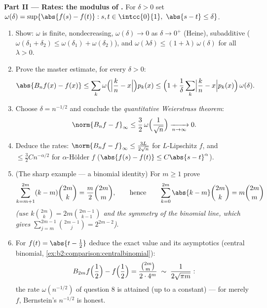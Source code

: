 \begin{problem}
\medskip
\noindent\textbf{Part II --- Rates: the modulus of .}
For $\delta > 0$ set $\omega(\delta) = \sup\{\abs{f(s) - f(t)}
: s, t \in \intcc{0}{1},\ \abs{s - t} \leq \delta\}$.
\begin{enumerate}[resume]
  \item Show: $\omega$ is finite, nondecreasing,
        $\omega(\delta) \to 0$ as $\delta \to 0^+$ (Heine),
        subadditive ($\omega(\delta_1 + \delta_2) \leq
        \omega(\delta_1) + \omega(\delta_2)$), and
        $\omega(\lambda\delta) \leq (1 +
        \lambda)\,\omega(\delta)$ for all $\lambda > 0$.
  \item Prove the master estimate, for every $\delta > 0$:
        \[
        \abs{B_nf(x) - f(x)}
        \leq \sum_k \omega\Bigl(\Bigl|\frac kn -
        x\Bigr|\Bigr)p_k(x)
        \leq \Bigl(1 + \frac1\delta\sum_k\Bigl|\frac kn -
        x\Bigr|p_k(x)\Bigr)\,\omega(\delta) .
        \]
  \item Choose $\delta = n^{-1/2}$ and conclude the
        \emph{quantitative Weierstrass theorem}:
        \[
        \norm{B_nf - f}_\infty \leq
        \frac32\,\omega\Bigl(\frac{1}{\sqrt n}\Bigr)
        \xrightarrow[n\to\infty]{} 0 .
        \]
  \item Deduce the rates: $\norm{B_nf - f}_\infty \leq
        \frac{3L}{2\sqrt n}$ for $L$-Lipschitz $f$, and $\leq
        \frac32 C n^{-\alpha/2}$ for $\alpha$-H\"older $f$
        ($\abs{f(s) - f(t)} \leq C\abs{s-t}^\alpha$).
  \item (The sharp example --- a binomial identity) For $m
        \geq 1$ prove
        \[
        \sum_{k=m+1}^{2m} (k - m)\binom{2m}{k}
        = \frac{m}{2}\binom{2m}{m},
        \qquad\text{hence}\qquad
        \sum_{k=0}^{2m}\abs{k - m}\binom{2m}{k}
        = m\binom{2m}{m}
        \]
        \emph{(use $k\binom{2m}k = 2m\binom{2m-1}{k-1}$ and the
        symmetry of the binomial line, which gives
        $\sum_{j=m}^{2m-1}\binom{2m-1}{j} = 2^{2m-2}$)}.
  \item For $f(t) = \abs{t - \frac12}$ deduce the exact value
        and its asymptotics (central binomial,
        \cref{ex:b2:comparison:centralbinomial}):
        \[
        B_{2m}f\Bigl(\frac12\Bigr) - f\Bigl(\frac12\Bigr)
        = \frac{\binom{2m}{m}}{2\cdot4^{m}}
        \;\sim\; \frac{1}{2\sqrt{\pi m}} :
        \]
        the rate $\omega(n^{-1/2})$ of question 8 is attained
        (up to a constant) --- for merely  $f$,
        Bernstein's $n^{-1/2}$ is honest.
\end{enumerate}


\end{problem}
